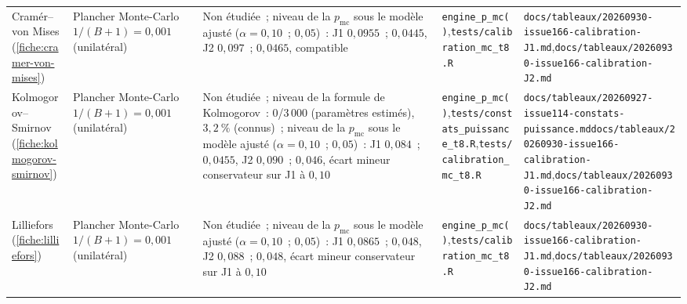 \documentclass[a4paper,11pt]{article}
\newcommand{\code}[1]{\texttt{\small #1}}
\begin{document}
\begin{landscape}
\begin{center}
\begin{longtable}{@{}>{\raggedright\arraybackslash}p{2.5cm}>{\raggedright\arraybackslash}p{3.6cm}>{\raggedright\arraybackslash}p{4.0cm}>{\raggedright\arraybackslash}p{6.7cm}>{\raggedright\arraybackslash}p{7.2cm}@{}}
Cramér--von Mises (\ref{fiche:cramer-von-mises}) & Plancher Monte-Carlo $1/(B+1) = 0{,}001$ (unilatéral) & Non étudiée~; niveau de la $p_{\mathrm{mc}}$ sous le modèle ajusté ($\alpha = 0{,}10$~; $0{,}05$)~: J1 $0{,}0955$~; $0{,}0445$, J2 $0{,}097$~; $0{,}0465$, compatible & \code{engine\_p\_mc()},\newline \code{tests/calibration\_mc\_t8.R} & \code{docs/tableaux/}\newline \code{20260930-issue166-calibration-J1.md},\newline \code{docs/tableaux/}\newline \code{20260930-issue166-calibration-J2.md} \\
Kolmogorov--Smirnov (\ref{fiche:kolmogorov-smirnov}) & Plancher Monte-Carlo $1/(B+1) = 0{,}001$ (unilatéral) & Non étudiée~; niveau de la formule de Kolmogorov~: 0/3\,000 (paramètres estimés), $3{,}2~\%$ (connus)~; niveau de la $p_{\mathrm{mc}}$ sous le modèle ajusté ($\alpha = 0{,}10$~; $0{,}05$)~: J1 $0{,}084$~; $0{,}0455$, J2 $0{,}090$~; $0{,}046$, écart mineur conservateur sur J1 à $0{,}10$ & \code{engine\_p\_mc()},\newline \code{tests/constats\_puissance\_t8.R},\newline \code{tests/calibration\_mc\_t8.R} & \code{docs/tableaux/}\newline \code{20260927-issue114-constats-puissance.md}\newline \code{docs/tableaux/}\newline \code{20260930-issue166-calibration-J1.md},\newline \code{docs/tableaux/}\newline \code{20260930-issue166-calibration-J2.md} \\
Lilliefors (\ref{fiche:lilliefors}) & Plancher Monte-Carlo $1/(B+1) = 0{,}001$ (unilatéral) & Non étudiée~; niveau de la $p_{\mathrm{mc}}$ sous le modèle ajusté ($\alpha = 0{,}10$~; $0{,}05$)~: J1 $0{,}0865$~; $0{,}048$, J2 $0{,}088$~; $0{,}048$, écart mineur conservateur sur J1 à $0{,}10$ & \code{engine\_p\_mc()},\newline \code{tests/calibration\_mc\_t8.R} & \code{docs/tableaux/}\newline \code{20260930-issue166-calibration-J1.md},\newline \code{docs/tableaux/}\newline \code{20260930-issue166-calibration-J2.md} \\

\end{longtable}
\end{center}
\end{landscape}
\end{document}
